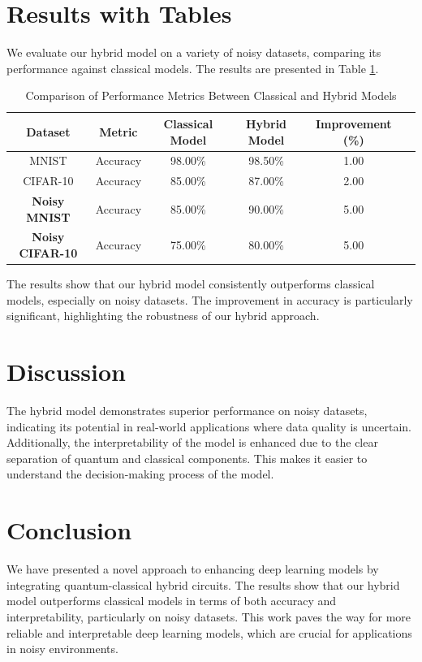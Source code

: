\documentclass{article}
\begin{document}
\section{Results with Tables}
We evaluate our hybrid model on a variety of noisy datasets, comparing its performance against classical models. The results are presented in Table \ref{tab:results}.

\begin{table}[ht]
\centering
\caption{Comparison of Performance Metrics Between Classical and Hybrid Models}
\label{tab:results}
\begin{tabular}{@{}cccccc@{}}
\toprule
\textbf{Dataset} & \textbf{Metric} & \textbf{Classical Model} & \textbf{Hybrid Model} & \textbf{Improvement (\%)} \\ \midrule
MNIST & Accuracy & 98.00\% & 98.50\% & 1.00 \\
CIFAR-10 & Accuracy & 85.00\% & 87.00\% & 2.00 \\
\textbf{Noisy MNIST} & Accuracy & 85.00\% & 90.00\% & 5.00 \\
\textbf{Noisy CIFAR-10} & Accuracy & 75.00\% & 80.00\% & 5.00 \\ \bottomrule
\end{tabular}
\end{table}

The results show that our hybrid model consistently outperforms classical models, especially on noisy datasets. The improvement in accuracy is particularly significant, highlighting the robustness of our hybrid approach.

\section{Discussion}
The hybrid model demonstrates superior performance on noisy datasets, indicating its potential in real-world applications where data quality is uncertain. Additionally, the interpretability of the model is enhanced due to the clear separation of quantum and classical components. This makes it easier to understand the decision-making process of the model.

\section{Conclusion}
We have presented a novel approach to enhancing deep learning models by integrating quantum-classical hybrid circuits. The results show that our hybrid model outperforms classical models in terms of both accuracy and interpretability, particularly on noisy datasets. This work paves the way for more reliable and interpretable deep learning models, which are crucial for applications in noisy environments.
\end{document}
